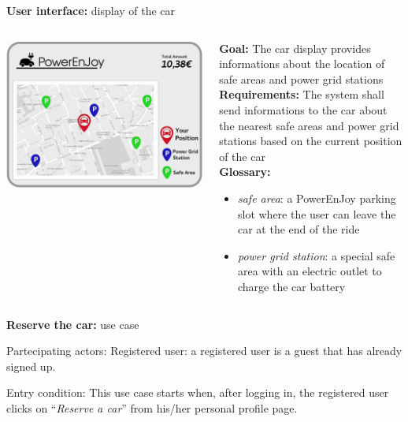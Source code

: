 \documentclass{beamer}
\begin{document}
	\begin{frame}{\textbf{User interface:} display of the car}
	\begin{columns}
		\begin{column}{0.4\textwidth}
			\includegraphics[width=0.9\columnwidth]{figures/screen.pdf}
		\end{column}
		\begin{column}{0.5\textwidth}
			\textbf{Goal:} The car display provides informations about the location of safe areas and power grid stations\\
			\textbf{Requirements:} The system shall send informations to the car about the nearest safe areas and power grid stations based on the current position of the car \\
			\textbf{Glossary:}
			\begin{itemize}
				\item \textit{safe area}: a PowerEnJoy parking slot where the user can leave the car at the end of the ride
				\item \textit{power grid station}: a special safe area with an electric outlet to charge the car battery  
			\end{itemize}
		\end{column}
	\end{columns}
	\end{frame}	

	\begin{frame}{\textbf{Reserve the car:} use case}
		\begin{block}{Partecipating actors:}
			Registered user: a registered user is a guest that has already signed up.
		\end{block}
		\begin{block}{Entry condition:}
			This use case starts when, after logging in, the registered user clicks on ``\textit{Reserve a car}'' from his/her personal profile page.
		\end{block}
	\end{frame}
\end{document}
